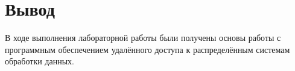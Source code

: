 \section*{Вывод}

В ходе выполнения лабораторной работы были получены основы работы с  программным  обеспечением  удалённого  доступа  к  распределённым системам обработки данных.